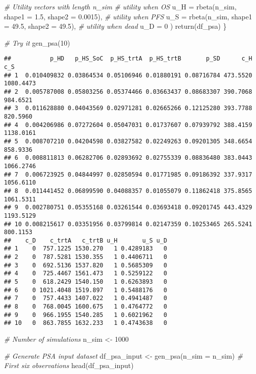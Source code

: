 \documentclass[
]{article}
\newenvironment{Shaded}{\begin{snugshade}}{\end{snugshade}}
\newcommand{\AttributeTok}[1]{\textcolor[rgb]{0.77,0.63,0.00}{#1}}
\newcommand{\CommentTok}[1]{\textcolor[rgb]{0.56,0.35,0.01}{\textit{#1}}}
\newcommand{\DecValTok}[1]{\textcolor[rgb]{0.00,0.00,0.81}{#1}}
\newcommand{\FloatTok}[1]{\textcolor[rgb]{0.00,0.00,0.81}{#1}}
\newcommand{\FunctionTok}[1]{\textcolor[rgb]{0.00,0.00,0.00}{#1}}
\newcommand{\NormalTok}[1]{#1}
\newcommand{\OtherTok}[1]{\textcolor[rgb]{0.56,0.35,0.01}{#1}}
\begin{document}
\begin{Shaded}
\begin{Highlighting}[]
    \CommentTok{\# Utility vectors with length n\_sim }
    \CommentTok{\# utility when OS}
    \AttributeTok{u\_H        =} \FunctionTok{rbeta}\NormalTok{(n\_sim, }\AttributeTok{shape1 =}  \FloatTok{1.5}\NormalTok{, }\AttributeTok{shape2 =} \FloatTok{0.0015}\NormalTok{), }
    \CommentTok{\# utility when PFS}
    \AttributeTok{u\_S        =} \FunctionTok{rbeta}\NormalTok{(n\_sim, }\AttributeTok{shape1 =} \FloatTok{49.5}\NormalTok{, }\AttributeTok{shape2 =} \FloatTok{49.5}\NormalTok{), }
    \CommentTok{\# utility when dead}
    \AttributeTok{u\_D        =} \DecValTok{0}                                              
\NormalTok{  )}
  \FunctionTok{return}\NormalTok{(df\_psa)}
\NormalTok{\}}


\CommentTok{\# Try it}
\FunctionTok{gen\_psa}\NormalTok{(}\DecValTok{10}\NormalTok{) }
\end{Highlighting}
\end{Shaded}

\begin{verbatim}
##           p_HD   p_HS_SoC  p_HS_trtA  p_HS_trtB       p_SD      c_H       c_S
## 1  0.010409832 0.03864534 0.05106946 0.01880191 0.08716784 473.5520 1080.4473
## 2  0.005787008 0.05803256 0.05374466 0.03663437 0.08683307 390.7068  984.6521
## 3  0.011628880 0.04043569 0.02971281 0.02665266 0.12125280 393.7788  820.5960
## 4  0.004206986 0.07272604 0.05047031 0.01737607 0.07939792 388.4159 1138.0161
## 5  0.008707210 0.04204598 0.03827582 0.02249263 0.09201305 348.6654  858.9336
## 6  0.008811813 0.06282706 0.02893692 0.02755339 0.08836480 383.0443 1066.2746
## 7  0.006723925 0.04844997 0.02850594 0.01771985 0.09186392 337.9317 1056.6110
## 8  0.011441452 0.06899590 0.04088357 0.01055079 0.11862418 375.8565 1061.5311
## 9  0.002780751 0.05355168 0.03261544 0.03693418 0.09201745 443.4329 1193.5129
## 10 0.008215617 0.03351956 0.03799814 0.02147359 0.10253465 265.5241  800.1153
##    c_D    c_trtA   c_trtB u_H       u_S u_D
## 1    0  757.1225 1530.270   1 0.4289183   0
## 2    0  787.5281 1530.355   1 0.4406711   0
## 3    0  692.5136 1537.820   1 0.5685309   0
## 4    0  725.4467 1561.473   1 0.5259122   0
## 5    0  618.2429 1540.150   1 0.6263893   0
## 6    0 1021.4048 1519.897   1 0.5488176   0
## 7    0  757.4433 1407.022   1 0.4941487   0
## 8    0  768.0045 1600.675   1 0.4764772   0
## 9    0  966.1955 1540.285   1 0.6021962   0
## 10   0  863.7855 1632.233   1 0.4743638   0
\end{verbatim}

\begin{Shaded}
\begin{Highlighting}[]
\CommentTok{\# Number of simulations}
\NormalTok{n\_sim }\OtherTok{\textless{}{-}} \DecValTok{1000}

\CommentTok{\# Generate PSA input dataset}
\NormalTok{df\_psa\_input }\OtherTok{\textless{}{-}} \FunctionTok{gen\_psa}\NormalTok{(}\AttributeTok{n\_sim =}\NormalTok{ n\_sim)}
\CommentTok{\# First six observations}
\FunctionTok{head}\NormalTok{(df\_psa\_input)}
\end{Highlighting}
\end{Shaded}
\end{document}
